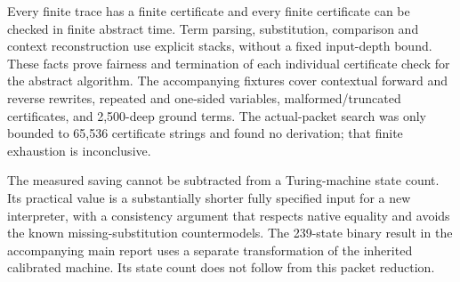 Every finite trace has a finite certificate and every finite certificate
can be checked in finite abstract time. Term parsing, substitution,
comparison and context reconstruction use explicit stacks, without a fixed
input-depth bound. These facts prove fairness and termination of each
individual certificate check for the abstract algorithm. The accompanying
fixtures cover contextual forward and reverse rewrites, repeated and
one-sided variables, malformed/truncated certificates, and 2,500-deep ground
terms. The actual-packet search was only bounded to 65,536 certificate
strings and found no derivation; that finite exhaustion is inconclusive.

The measured saving cannot be subtracted from a Turing-machine state count.
Its practical value is a substantially shorter fully specified input for a
new interpreter, with a consistency argument that respects native equality
and avoids the known missing-substitution countermodels. The 239-state
binary result in the accompanying main report uses a separate transformation
of the inherited calibrated machine. Its state count does not follow from
this packet reduction.

